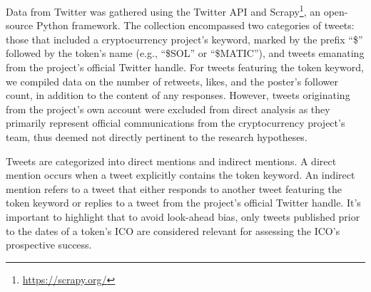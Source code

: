 \documentclass[runningheads]{llncs}
\begin{document}

Data from Twitter was gathered using the Twitter API and Scrapy\footnote{\url{https://scrapy.org/}}, an open-source Python framework. The collection encompassed two categories of tweets: those that included a cryptocurrency project's keyword, marked by the prefix ``\$'' followed by the token's name (e.g., ``\$SOL'' or ``\$MATIC''), and tweets emanating from the project's official Twitter handle. For tweets featuring the token keyword, we compiled data on the number of retweets, likes, and the poster's follower count, in addition to the content of any responses. However, tweets originating from the project’s own account were excluded from direct analysis as they primarily represent official communications from the cryptocurrency project's team, thus deemed not directly pertinent to the research hypotheses.


Tweets are categorized into direct mentions and indirect mentions. A direct mention occurs when a tweet explicitly contains the token keyword. An indirect mention refers to a tweet that either responds to another tweet featuring the token keyword or replies to a tweet from the project's official Twitter handle. It's important to highlight that to avoid look-ahead bias, only tweets published prior to the dates of a token's ICO are considered relevant for assessing the ICO's prospective success.
\end{document}
